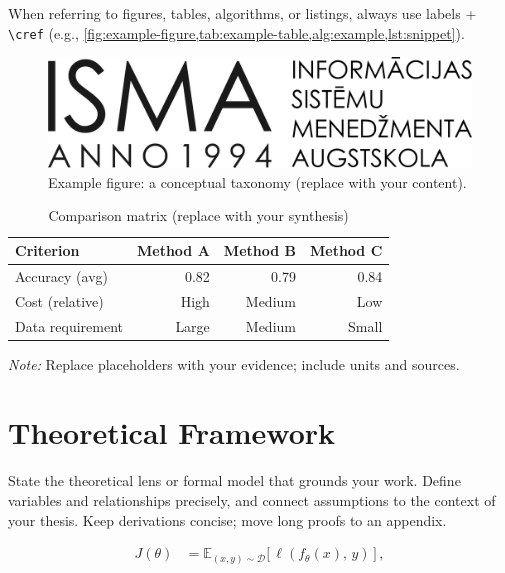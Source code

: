 When referring to figures, tables, algorithms, or listings, always use labels + \verb|\cref| (e.g., \cref{fig:example-figure,tab:example-table,alg:example,lst:snippet}).

\begin{figure}[h]
  \centering
  \includegraphics[width=0.7\linewidth]{b_chapters/chapter1/assets/isma_logo.png}
  \caption{Example figure: a conceptual taxonomy (replace with your content).}
  \label{fig:example-figure}
\end{figure}

{\singlespacing
\begin{table}[h]
  \caption{Comparison matrix (replace with your synthesis)}
  \label{tab:example-table}
  \centering
  \begin{tabular}{lrrr}
    \toprule
    Criterion            & Method A & Method B & Method C\\
    \midrule
    Accuracy (avg)       & 0.82     & 0.79     & 0.84\\
    Cost (relative)      & High     & Medium   & Low\\
    Data requirement     & Large    & Medium   & Small\\
    \bottomrule
  \end{tabular}

  \vspace{2mm}
  \emph{Note:} Replace placeholders with your evidence; include units and sources.
\end{table}
}

\section{Theoretical Framework}
\label{sec:theory}
State the theoretical lens or formal model that grounds your work. Define variables and relationships precisely, and connect assumptions to the context of your thesis. Keep derivations concise; move long proofs to an appendix.

\begin{align}
  \label{eq:objective}
  J(\theta) &= \mathbb{E}_{(x,y)\sim \mathcal{D}} \bigl[\, \ell(f_\theta(x),\, y)\, \bigr] \, ,
\end{align}

